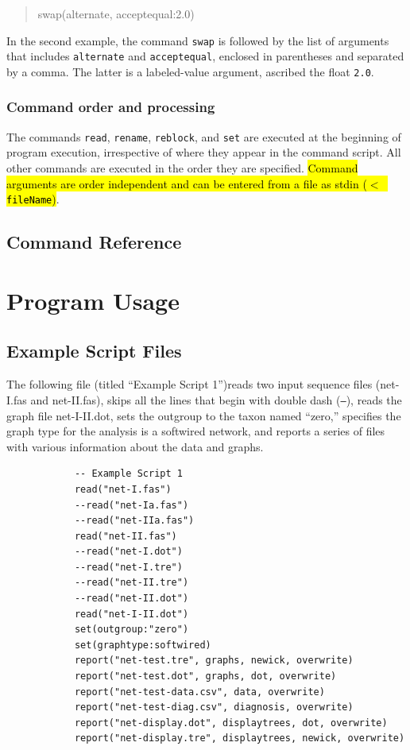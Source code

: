 \documentclass[11pt]{book}
\begin{document}
{{		
		\begin{quote}
		swap(alternate, acceptequal:2.0)
		\end{quote}
				
		\noindent In the second example, the command \texttt{swap} is followed by the list 
		of arguments that includes \texttt{alternate} and \texttt{acceptequal}, enclosed in 
		parentheses and separated by a comma. The latter is a labeled-value argument, 
		ascribed the float \texttt{2.0}.
				
	\subsection{Command order and processing}
		The commands \texttt{read}, \texttt{rename}, \texttt{reblock}, and \texttt{set} are 
		executed at the beginning of program execution, irrespective of where they appear 
		in the command script. All other commands are executed in the order they are specified. 
		\hl{Command arguments are order independent and can be entered from a file as 
		stdin (\texttt{$<$ fileName})}.



\section{Command Reference}
	

\chapter{Program Usage}
\section{Example Script Files}
	The following file (titled ``Example Script 1'')reads two input sequence files (net-I.fas and net-II.fas), 
	skips all 	the lines that begin with double dash (\texttt{--}), reads the graph file net-I-II.dot, sets the 
	outgroup to the taxon named ``zero,'' specifies the graph type for the analysis is a softwired network, 
	and 	reports a series of files with various information about the data and graphs.
	
		\begin{verbatim}
			-- Example Script 1
			read("net-I.fas")
			--read("net-Ia.fas")
			--read("net-IIa.fas")
			read("net-II.fas")
			--read("net-I.dot")
			--read("net-I.tre")
			--read("net-II.tre")
			--read("net-II.dot")
			read("net-I-II.dot")
			set(outgroup:"zero")
			set(graphtype:softwired)
			report("net-test.tre", graphs, newick, overwrite)
			report("net-test.dot", graphs, dot, overwrite)
			report("net-test-data.csv", data, overwrite)
			report("net-test-diag.csv", diagnosis, overwrite)
			report("net-display.dot", displaytrees, dot, overwrite)
			report("net-display.tre", displaytrees, newick, overwrite)
		\end{verbatim}
	
}}
\end{document}

